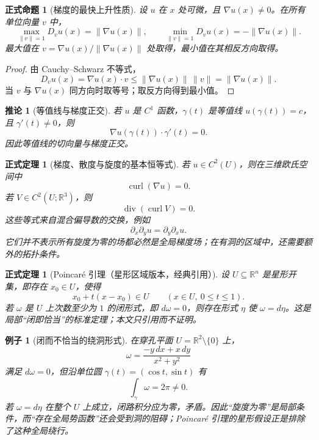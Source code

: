 \documentclass[UTF8,fontset=none,a4paper,11pt]{ctexart}
\theoremstyle{foundation-definition}
\theoremstyle{foundation-theorem}
\newtheorem{theorem}[definition]{正式定理}
\theoremstyle{foundation-proposition}
\newtheorem{proposition}[definition]{正式命题}
\theoremstyle{foundation-example}
\newtheorem{example}[definition]{例子}
\theoremstyle{foundation-remark}
\theoremstyle{foundation-theorem}
\newtheorem{corollary}[definition]{推论}
\begin{document}
\begin{proposition}[梯度的最快上升性质]\label{prop:gradient-steepest}
设 \(u\) 在 \(x\) 处可微，且 \(\nabla u(x)\neq0\)。在所有单位向量 \(v\) 中，
\[
\max_{\|v\|=1}D_vu(x)=\|\nabla u(x)\|,
\qquad
\min_{\|v\|=1}D_vu(x)=-\|\nabla u(x)\|.
\]
最大值在 \(v=\nabla u(x)/\|\nabla u(x)\|\) 处取得，最小值在其相反方向取得。
\end{proposition}

\begin{proof}
由 Cauchy--Schwarz 不等式，
\[
D_vu(x)=\nabla u(x)\cdot v
\leq\|\nabla u(x)\|\,\|v\|
=\|\nabla u(x)\|.
\]
当 \(v\) 与 \(\nabla u(x)\) 同方向时取等号；取反方向得到最小值。
\end{proof}

\begin{corollary}[等值线与梯度正交]
若 \(u\) 是 \(C^1\) 函数，\(\gamma(t)\) 是等值线 \(u(\gamma(t))=c\)，且 \(\gamma'(t)\neq0\)，则
\[
\nabla u(\gamma(t))\cdot\gamma'(t)=0.
\]
因此等值线的切向量与梯度正交。
\end{corollary}

\begin{theorem}[梯度、散度与旋度的基本恒等式]
若 \(u\in C^2(U)\)，则在三维欧氏空间中
\[
\operatorname{curl}(\nabla u)=0.
\]
若 \(V\in C^2(U;\mathbb R^3)\)，则
\[
\operatorname{div}(\operatorname{curl}V)=0.
\]
这些等式来自混合偏导数的交换，例如
\[
\partial_x\partial_yu=\partial_y\partial_xu.
\]
它们并不表示所有旋度为零的场都必然是全局梯度场；在有洞的区域中，还需要额外的拓扑条件。
\end{theorem}

\begin{theorem}[Poincaré 引理（星形区域版本，经典引用）]\label{thm:poincare-lemma}
设 \(U\subseteq\mathbb R^n\) 是星形开集，即存在 \(x_0\in U\)，使得
\[
x_0+t(x-x_0)\in U\qquad(x\in U,\ 0\leq t\leq1).
\]
若 \(\omega\) 是 \(U\) 上次数至少为 \(1\) 的闭形式，即 \(d\omega=0\)，则存在形式
\(\eta\) 使 \(\omega=d\eta\)。这是局部“闭即恰当”的标准定理；本文只引用而不证明。
\end{theorem}

\begin{example}[闭而不恰当的绕洞形式]
在穿孔平面 \(U=\mathbb R^2\setminus\{0\}\) 上，
\[
\omega=\frac{-y\,dx+x\,dy}{x^2+y^2}
\]
满足 \(d\omega=0\)，但沿单位圆 \(\gamma(t)=(\cos t,\sin t)\) 有
\[
\int_\gamma\omega=2\pi\ne0.
\]
若 \(\omega=d\eta\) 在整个 \(U\) 上成立，闭路积分应为零，矛盾。因此“旋度为零”是局部条件，而“存在全局势函数”还会受到洞的阻碍；Poincaré 引理的星形假设正是排除了这种全局绕行。
\end{example}
\end{document}
